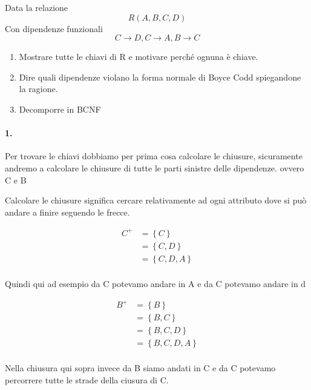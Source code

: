 \begin{exmp}
    Data la relazione 
    \[R(A,B,C,D)\]
    Con dipendenze funzionali
    \[ C \rightarrow D,C \rightarrow A,B \rightarrow C \]
    
    \begin{enumerate}
        \item Mostrare tutte le chiavi di R e motivare perché ognuna è chiave.
        \item Dire quali dipendenze violano la forma normale di Boyce Codd spiegandone la ragione.
        \item Decomporre in BCNF
    \end{enumerate}
    
    \paragraph{1.} Per trovare le chiavi dobbiamo per prima cosa calcolare le chiusure, sicuramente andremo a calcolare le chiusure di tutte le parti sinistre delle dipendenze. ovvero C e B

    Calcolare le chiusure significa cercare relativamente ad ogni attributo dove si può andare a finire seguendo le frecce.

    \begin{equation}
        \begin{split}
            C^+&= \left\{ C \right\} \\
            &= \left\{ C,D \right\}  \\
            &= \left\{ C,D,A \right\}  \\
        \end{split}
    \end{equation}

    Quindi qui ad esempio da C potevamo andare in A e da C potevamo andare in d

    \begin{equation}
        \begin{split}
            B^+&= \left\{  B \right\}\\
            &= \left\{  B,C \right\}\\
            &= \left\{  B,C,D \right\}\\
            &= \left\{  B,C,D,A \right\}\\
        \end{split}
    \end{equation}

    Nella chiusura qui sopra invece da B siamo andati in C e da C potevamo percorrere tutte le strade della ciusura di C.


\end{exmp}
